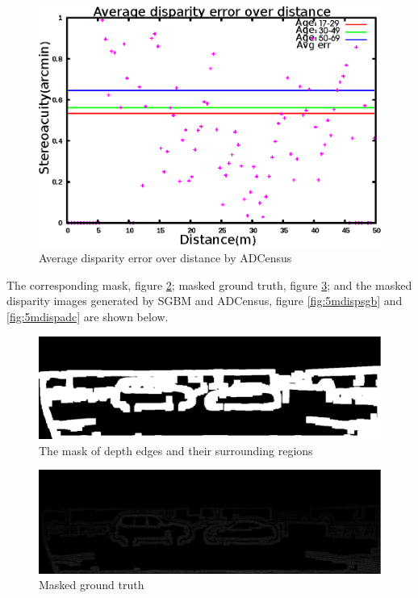 \begin{figure}[H]
\centering
\includegraphics[scale=0.8]{adcimg5pix3msk}
\caption{Average disparity error over distance by ADCensus}
\label{fig:imgfull5}
\end{figure}

\noindent
The corresponding mask, figure \ref{fig:msk}; masked ground truth, figure \ref{fig:gtmsk}; and
the masked disparity images generated by SGBM and ADCensus, figure \ref{fig:5mdispsgb} and \ref{fig:5mdispadc} 
are shown below.

\begin{figure}[H]
\centering
\includegraphics[scale=0.35]{5msk}
\caption{The mask of depth edges and their surrounding regions}
\label{fig:msk}
\end{figure} 

\begin{figure}[H]
\centering
\includegraphics[scale=0.35]{5gt}
\caption{Masked ground truth}
\label{fig:gtmsk}
\end{figure} 

